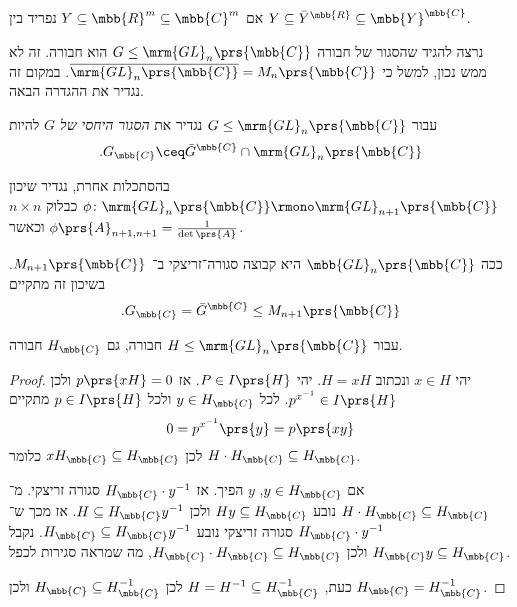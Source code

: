 \documentclass[10pt, twoside]{book}
\begin{document}
\begin{remark}
אם
$Y \subseteq \mbb{R}^m \subseteq \mbb{C}^m$
נפריד בין
$Y \subseteq \bar{Y}^{\mbb{R}} \subseteq \mbb{Y}^{\mbb{C}}$.

נרצה להגיד שהסגור של חבורה
$G \leq \mrm{GL}_n\prs{\mbb{C}}$
הוא חבורה. זה לא ממש נכון, למשל כי
$\overline{\mrm{GL}_n\prs{\mbb{C}}} = M_n\prs{\mbb{C}}$.
במקום זה נגדיר את ההגדרה הבאה.
\end{remark}

\begin{definition}
עבור
$G \leq \mrm{GL}_n\prs{\mbb{C}}$
נגדיר את
\emph{הסגור היחסי של
$G$}
להיות
\[\text{.} G_{\mbb{C}} \ceq \bar{G}^{\mbb{C}} \cap \mrm{GL}_n\prs{\mbb{C}}\]
\end{definition}

\begin{example}
בהסתכלות אחרת, נגדיר שיכון
$\phi \colon \mrm{GL}_n\prs{\mbb{C}} \rmono \mrm{GL}_{n+1}\prs{\mbb{C}}$
כבלוק
$n \times n$
וכאשר
$\phi\prs{A}_{n+1,n+1} = \frac{1}{\det\prs{A}}$.

ככה
$\mbb{GL}_n\prs{\mbb{C}}$
היא קבוצה סגורה־זריצקי ב־%
$M_{n+1}\prs{\mbb{C}}$.
בשיכון זה מתקיים
\[\text{.} G_{\mbb{C}} = \bar{G}^{\mbb{C}} \leq M_{n+1}\prs{\mbb{C}}\]
\end{example}

\begin{lemma}
עבור
$H \leq \mrm{GL}_n\prs{\mbb{C}}$
חבורה, גם
$H_{\mbb{C}}$
חבורה.
\end{lemma}

\begin{proof}
יהי
$x \in H$
ונכתוב
$H = xH$.
יהי
$P \in I\prs{H}$.
אז
$p\prs{xH} = 0$
ולכן
$p^{x^{-1}} \in I\prs{H}$.
לכל
$y \in H_{\mbb{C}}$
ולכל
$p \in I\prs{H}$
מתקיים
\[0 = p^{x^{-1}}\prs{y} = p\prs{xy}\]
לכן
$xH_{\mbb{C}} \subseteq H_{\mbb{C}}$
כלומר
$H \cdot H_{\mbb{C}} \subseteq H_{\mbb{C}}$.

אם
$y \in H_{\mbb{C}}$,
$y$
הפיך.
אז
$H_{\mbb{C}} \cdot y^{-1}$
סגורה זריצקי.
מ־%
$H \cdot H_{\mbb{C}} \subseteq H_{\mbb{C}}$
נובע
$H y \subseteq H_{\mbb{C}}$
ולכן
$H \subseteq H_{\mbb{C}} y^{-1}$.
אז מכך ש־%
$H_{\mbb{C}} \cdot y^{-1}$
סגורה זריצקי נובע
$H_{\mbb{C}} \subseteq H_{\mbb{C}} y^{-1}$.
נקבל
$H_{\mbb{C}}y \subseteq H_{\mbb{C}}$
ולכן
$H_{\mbb{C}} \cdot H_{\mbb{C}} \subseteq H_{\mbb{C}}$,
מה שמראה סגירות לכפל.

כעת,
$H = H^{-1} \subseteq H_{\mbb{C}}^{-1}$
לכן
$H_{\mbb{C}} \subseteq H_{\mbb{C}}^{-1}$
ולכן
$H_{\mbb{C}} = H_{\mbb{C}}^{-1}$.
\end{proof}
\end{document}
